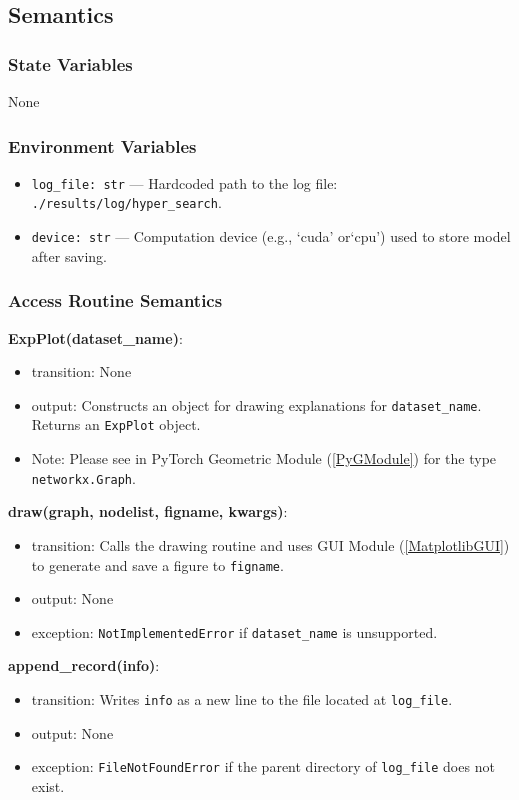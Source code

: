 \documentclass[12pt, titlepage]{article}
\begin{document}
\subsection{Semantics}

\subsubsection{State Variables}
None

\subsubsection{Environment Variables}
\begin{itemize}
  \item \texttt{log\_file: str} — Hardcoded path to the log file: \texttt{./results/log/hyper\_search}.
  \item \texttt{device: str} — Computation device (e.g., `cuda' or`cpu') used to store model after saving.
\end{itemize}

\subsubsection{Access Routine Semantics}

\noindent \textbf{ExpPlot(dataset\_name)}:
\begin{itemize}
  \item transition: None
  \item output: Constructs an object for drawing explanations for \texttt{dataset\_name}. Returns an \texttt{ExpPlot} object.
  \item Note: Please see in PyTorch Geometric Module (\ref{PyGModule}) for the type \texttt{networkx.Graph}.
\end{itemize}

\noindent \textbf{draw(graph, nodelist, figname, kwargs)}:
\begin{itemize}
  \item transition: Calls the drawing routine and uses GUI Module (\ref{MatplotlibGUI}) to generate and save a figure to \texttt{figname}.
  \item output: None
  \item exception: \texttt{NotImplementedError} if \texttt{dataset\_name} is unsupported.
\end{itemize}

\noindent \textbf{append\_record(info)}:
\begin{itemize}
  \item transition: Writes \texttt{info} as a new line to the file located at \texttt{log\_file}.
  \item output: None
  \item exception: \texttt{FileNotFoundError} if the parent directory of \texttt{log\_file} does not exist.
\end{itemize}
\end{document}
